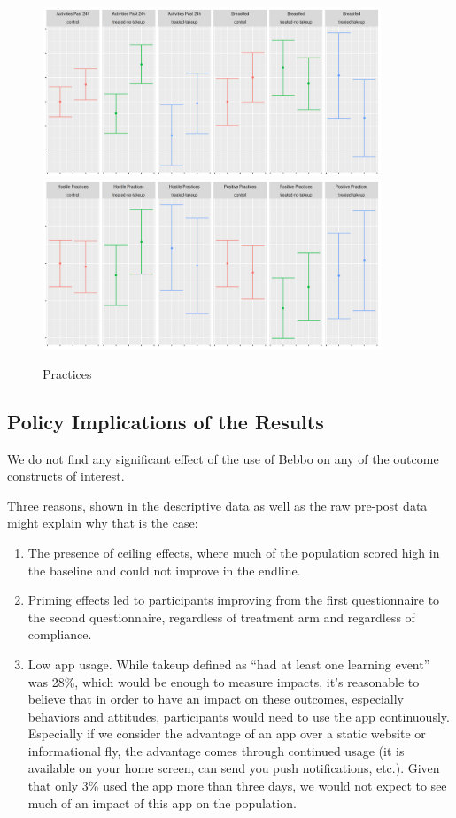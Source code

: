 \documentclass{article}
\begin{document}
\begin{figure}[H]
  \centering
\includegraphics[width=0.9\textwidth]{plots/pre_post/Pooled: Breastfed.png}
\includegraphics[width=0.9\textwidth]{plots/pre_post/Pooled: Positive Practices.png}
\caption{Practices}
\label{fig:practices-pre-post}
\end{figure}

\subsection*{Policy Implications of the Results}

We do not find any significant effect of the use of Bebbo on any of the outcome constructs of interest.

Three reasons, shown in the descriptive data as well as the raw pre-post data might explain why that is the case:
\begin{enumerate}
\item The presence of ceiling effects, where much of the population scored high in the baseline and could not improve in the endline.
\item Priming effects led to participants improving from the first questionnaire to the second questionnaire, regardless of treatment arm and regardless of compliance.
\item Low app usage. While takeup defined as ``had at least one learning event'' was 28\%, which would be enough to measure impacts, it's reasonable to believe that in order to have an impact on these outcomes, especially behaviors and attitudes, participants would need to use the app continuously. Especially if we consider the advantage of an app over a static website or informational fly, the advantage comes through continued usage (it is available on your home screen, can send you push notifications, etc.). Given that only 3\% used the app more than three days, we would not expect to see much of an impact of this app on the population.
\end{enumerate}
\end{document}
